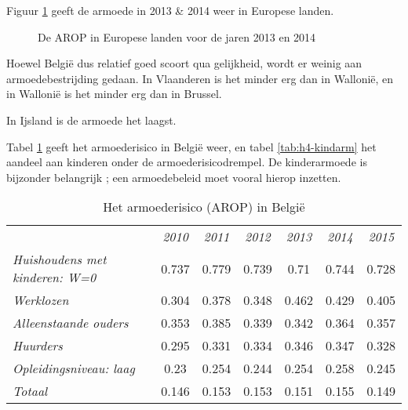 \par Figuur \ref{fig:h4-arop} geeft de armoede in 2013 \& 2014 weer in Europese landen.

\begin{figure}[H]
\small\centering\captionsetup{justification=centering,margin=2cm}
\caption{De AROP in Europese landen voor de jaren 2013 en 2014}
\label{fig:h4-arop}
\end{figure}

Hoewel Belgi\"e dus relatief goed scoort qua gelijkheid, wordt er weinig aan armoedebestrijding gedaan. In Vlaanderen is het minder erg dan in Walloni\"e, en in Walloni\"e is het minder erg dan in Brussel.
\par In Ijsland is de armoede het laagst.\\

\par Tabel \ref{tab:h4-arop} geeft het armoederisico in Belgi\"e weer, en tabel \ref{tab:h4-kindarm} het aandeel aan kinderen onder de armoederisicodrempel. De kinderarmoede is bijzonder belangrijk ; een armoedebeleid moet vooral hierop inzetten.

\begin{table}[H]
\centering
\begin{tabular}{lcccccc}
 & \cellcolor[HTML]{EFEFEF}\textit{2010} & \cellcolor[HTML]{EFEFEF}\textit{2011} & \cellcolor[HTML]{EFEFEF}\textit{2012} & \cellcolor[HTML]{EFEFEF}\textit{2013} & \cellcolor[HTML]{EFEFEF}\textit{2014} & \cellcolor[HTML]{EFEFEF}\textit{2015} \\
\cellcolor[HTML]{EFEFEF}\textit{Huishoudens met kinderen: W=0} & 0.737 & 0.779 & 0.739 & 0.71 & 0.744 & 0.728 \\
\cellcolor[HTML]{EFEFEF}\textit{Werklozen} & 0.304 & 0.378 & 0.348 & 0.462 & 0.429 & 0.405 \\
\cellcolor[HTML]{EFEFEF}\textit{Alleenstaande ouders} & 0.353 & 0.385 & 0.339 & 0.342 & 0.364 & 0.357 \\
\cellcolor[HTML]{EFEFEF}\textit{Huurders} & 0.295 & 0.331 & 0.334 & 0.346 & 0.347 & 0.328 \\
\cellcolor[HTML]{EFEFEF}\textit{Opleidingsniveau: laag} & 0.23 & 0.254 & 0.244 & 0.254 & 0.258 & 0.245 \\
\cellcolor[HTML]{EFEFEF}\textit{Totaal} & 0.146 & 0.153 & 0.153 & 0.151 & 0.155 & 0.149
\end{tabular}
\caption{Het armoederisico (AROP) in Belgi\"e}
\label{tab:h4-arop}
\end{table}

